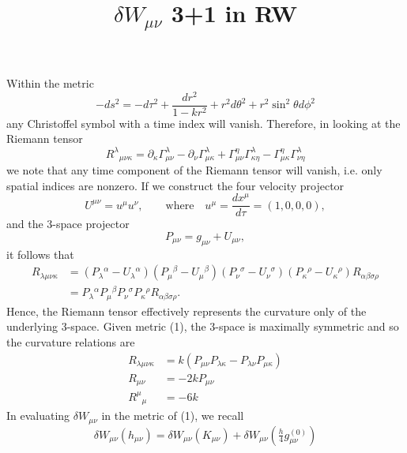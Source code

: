 \documentclass[10pt,letterpaper]{article}
\title{$\delta W_{\mu\nu}$ 3+1 in RW}
\date{}
\begin{document}
\maketitle
\noindent 
Within the metric
\begin{equation}
	-ds^2 = -d\tau^2 + \frac{dr^2}{1-kr^2}+ r^2d\theta^2 + r^2\sin^2\theta d\phi^2
\end{equation}
any Christoffel symbol with a time index will vanish. Therefore, in looking at the Riemann tensor
\begin{equation}
R^\lambda{}_{\mu\nu\kappa} = \partial_\kappa \Gamma^\lambda_{\mu\nu} - \partial_\nu \Gamma^\lambda_{\mu\kappa}
+\Gamma^\eta_{\mu\nu}\Gamma^\lambda_{\kappa\eta} - \Gamma^\eta_{\mu\kappa}\Gamma^\lambda_{\nu\eta}
\end{equation}
we note that any time component of the Riemann tensor will vanish, i.e. only spatial indices are nonzero. If we construct the four velocity projector
\begin{equation}
U^{\mu\nu} = u^\mu u^\nu,\qquad \text{where}\quad u^\mu = \frac{d x^\mu}{d\tau} = (1,0,0,0),
\end{equation}
and the 3-space projector
\begin{equation}
	P_{\mu\nu} = g_{\mu\nu} + U_{\mu\nu},
\end{equation}
it follows that 
\begin{align}
	R_{\lambda\mu\nu\kappa} &= (P_{\lambda}{}^{\alpha}-U_{\lambda}{}^{\alpha}) (P_{\mu}{}^{\beta}-U_{\mu}{}^{\beta}) (P_{\nu}{}^{\sigma}-U_{\nu}{}^{\sigma}) (P_{\kappa}{}^{\rho}-U_{\kappa}{}^{\rho})
	R_{\alpha\beta\sigma\rho}\nonumber \\
	&=P_{\lambda}{}^{\alpha}P_{\mu}{}^{\beta}P_{\nu}{}^{\sigma}P_{\kappa}{}^{\rho} R_{\alpha\beta\sigma\rho}.
\end{align}
Hence, the Riemann tensor effectively represents the curvature only of the underlying 3-space. Given metric (1), the 3-space is maximally symmetric and so the curvature relations are
\begin{align}
R_{\lambda\mu\nu\kappa}&= k(P_{\mu\nu}P_{\lambda\kappa}-P_{\lambda\nu}P_{\mu\kappa})\\
R_{\mu\nu} &= -2kP_{\mu\nu}\\
R^\mu{}_\mu &= -6k
\end{align}
In evaluating $\delta W_{\mu\nu}$ in the metric of (1), we recall
\begin{equation}
	\delta W_{\mu\nu}(h_{\mu\nu}) = \delta W_{\mu\nu}(K_{\mu\nu}) + \delta W_{\mu\nu}(\tfrac h4 g_{\mu\nu}^{(0)})
\end{equation}
\end{document}
